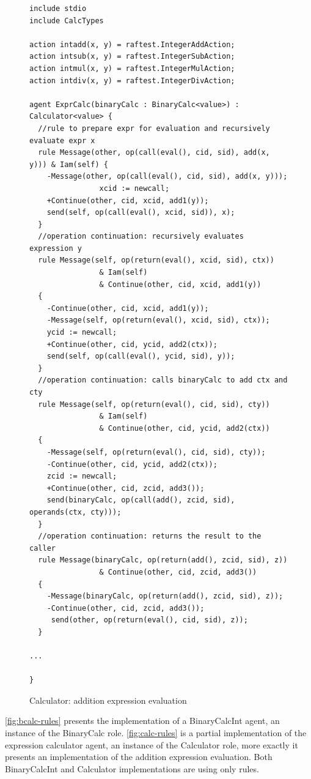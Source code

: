 \documentclass[a4paper,12pt,oneside,fleqn]{book} %
\begin{document}
\begin{figure}\footnotesize %
\begin{verbatim}
include stdio
include CalcTypes

action intadd(x, y) = raftest.IntegerAddAction;
action intsub(x, y) = raftest.IntegerSubAction;
action intmul(x, y) = raftest.IntegerMulAction;
action intdiv(x, y) = raftest.IntegerDivAction;

agent ExprCalc(binaryCalc : BinaryCalc<value>) : Calculator<value> {
  //rule to prepare expr for evaluation and recursively evaluate expr x
  rule Message(other, op(call(eval(), cid, sid), add(x, y))) & Iam(self) {
    -Message(other, op(call(eval(), cid, sid), add(x, y)));
                xcid := newcall;
    +Continue(other, cid, xcid, add1(y));
    send(self, op(call(eval(), xcid, sid)), x);
  }
  //operation continuation: recursively evaluates expression y
  rule Message(self, op(return(eval(), xcid, sid), ctx))
                & Iam(self)
                & Continue(other, cid, xcid, add1(y))
  {
    -Continue(other, cid, xcid, add1(y));
    -Message(self, op(return(eval(), xcid, sid), ctx));
    ycid := newcall;
    +Continue(other, cid, ycid, add2(ctx));
    send(self, op(call(eval(), ycid, sid), y));
  }
  //operation continuation: calls binaryCalc to add ctx and cty
  rule Message(self, op(return(eval(), cid, sid), cty))
                & Iam(self)
                & Continue(other, cid, ycid, add2(ctx))
  {
    -Message(self, op(return(eval(), cid, sid), cty));
    -Continue(other, cid, ycid, add2(ctx));
    zcid := newcall;
    +Continue(other, cid, zcid, add3());
    send(binaryCalc, op(call(add(), zcid, sid), operands(ctx, cty)));
  }
  //operation continuation: returns the result to the caller
  rule Message(binaryCalc, op(return(add(), zcid, sid), z))
                & Continue(other, cid, zcid, add3())
  {
    -Message(binaryCalc, op(return(add(), zcid, sid), z));
    -Continue(other, cid, zcid, add3());
     send(other, op(return(eval(), cid, sid), z));
  }

...

}

\end{verbatim}
\caption{Calculator: addition expression evaluation}
\label{fig:calc-rules}
\end{figure} %

\autoref{fig:bcalc-rules} presents the implementation of a BinaryCalcInt
agent, an instance of the BinaryCalc role.  \autoref{fig:calc-rules} is
a partial implementation of the expression calculator agent, an instance of
the Calculator role, more exactly it presents an implementation of the
addition expression evaluation. Both BinaryCalcInt and Calculator
implementations are using only rules.
\end{document}
